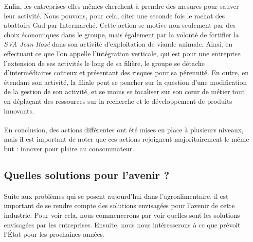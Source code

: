 \documentclass[a4paper,12pt]{report}
\begin{document}
			Enfin, les entreprises elles-mêmes cherchent à prendre des mesures pour sauver leur activité. Nous pouvons, pour cela, citer une seconde fois le rachat des abattoirs Gad par Intermarché. Cette action se motive non seulement par des choix économiques dans le groupe, mais également par la volonté de fortifier la \textit{SVA Jean Rozé} dans son activité d’exploitation de viande animale. Ainsi, en effectuant ce que l’on appelle l’intégration verticale, qui est pour une entreprise l’extension de ses activités le long de sa filière, le groupe se détache d’intermédiaires coûteux et présentant des risques pour sa pérennité. En outre, en étendant son activité, la filiale peut se pencher sur la question d’une modification de la gestion de son activité, et se moins se focaliser sur son cœur de métier tout en déplaçant des ressources sur la recherche et le développement de produits innovants.

			\paragraph{}En conclusion, des actions différentes ont été mises en place à plusieurs niveaux, mais il est important de noter que ces actions rejoignent majoritairement le même but : innover pour plaire au consommateur.

			
		\subsection{Quelles solutions pour l'avenir ?}
			\paragraph{}Suite aux problèmes qui se posent aujourd'hui dans l’agroalimentaire, il est important de se rendre compte des solutions envisagées pour l’avenir de cette industrie. Pour voir cela, nous commencerons par voir quelles sont les solutions envisagées par les entreprises. Ensuite, nous nous intéresserons à ce que prévoit l’État pour les prochaines années.
			
\end{document}
